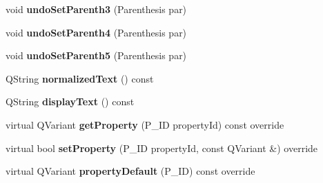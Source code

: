 \begin{DoxyCompactItemize}
void {\bfseries undo\+Set\+Parenth3} (Parenthesis par)
\item 
\mbox{\label{class_ms_1_1_figured_bass_item_aabf4fc29f8c98e05b5fa578d1063b752}} 
void {\bfseries undo\+Set\+Parenth4} (Parenthesis par)
\item 
\mbox{\label{class_ms_1_1_figured_bass_item_a99cf12322007549106b7fa93e1000c0c}} 
void {\bfseries undo\+Set\+Parenth5} (Parenthesis par)
\item 
\mbox{\label{class_ms_1_1_figured_bass_item_abd84114fd59eee992f2f17de3bf7ef8d}} 
Q\+String {\bfseries normalized\+Text} () const
\item 
\mbox{\label{class_ms_1_1_figured_bass_item_a365f7fcbe31ba554521485ec3ac8e308}} 
Q\+String {\bfseries display\+Text} () const
\item 
\mbox{\label{class_ms_1_1_figured_bass_item_ab030eb349710c832e9fd08918460ce99}} 
virtual Q\+Variant {\bfseries get\+Property} (P\+\_\+\+ID property\+Id) const override
\item 
\mbox{\label{class_ms_1_1_figured_bass_item_aabf7c3a7d9ce68ff835ccf951221ac95}} 
virtual bool {\bfseries set\+Property} (P\+\_\+\+ID property\+Id, const Q\+Variant \&) override
\item 
\mbox{\label{class_ms_1_1_figured_bass_item_ae8ea3e67263ca063f7c421538e2c3365}} 
virtual Q\+Variant {\bfseries property\+Default} (P\+\_\+\+ID) const override
\end{DoxyCompactItemize}
